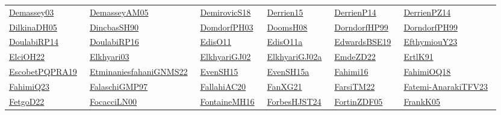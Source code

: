 \begin{longtable}{*{6}{l}}
\href{works/Demassey03.pdf}{Demassey03}~\cite{Demassey03} & \href{}{DemasseyAM05}~\cite{DemasseyAM05} & \href{works/DemirovicS18.pdf}{DemirovicS18}~\cite{DemirovicS18} & \href{works/Derrien15.pdf}{Derrien15}~\cite{Derrien15} & \href{works/DerrienP14.pdf}{DerrienP14}~\cite{DerrienP14} & \href{works/DerrienPZ14.pdf}{DerrienPZ14}~\cite{DerrienPZ14}\\ 
\href{works/DilkinaDH05.pdf}{DilkinaDH05}~\cite{DilkinaDH05} & \href{works/DincbasSH90.pdf}{DincbasSH90}~\cite{DincbasSH90} & \href{}{DomdorfPH03}~\cite{DomdorfPH03} & \href{works/DoomsH08.pdf}{DoomsH08}~\cite{DoomsH08} & \href{}{DorndorfHP99}~\cite{DorndorfHP99} & \href{}{DorndorfPH99}~\cite{DorndorfPH99}\\ 
\href{works/DoulabiRP14.pdf}{DoulabiRP14}~\cite{DoulabiRP14} & \href{works/DoulabiRP16.pdf}{DoulabiRP16}~\cite{DoulabiRP16} & \href{works/EdisO11.pdf}{EdisO11}~\cite{EdisO11} & \href{}{EdisO11a}~\cite{EdisO11a} & \href{}{EdwardsBSE19}~\cite{EdwardsBSE19} & \href{works/EfthymiouY23.pdf}{EfthymiouY23}~\cite{EfthymiouY23}\\ 
\href{}{ElciOH22}~\cite{ElciOH22} & \href{works/Elkhyari03.pdf}{Elkhyari03}~\cite{Elkhyari03} & \href{works/ElkhyariGJ02.pdf}{ElkhyariGJ02}~\cite{ElkhyariGJ02} & \href{works/ElkhyariGJ02a.pdf}{ElkhyariGJ02a}~\cite{ElkhyariGJ02a} & \href{works/EmdeZD22.pdf}{EmdeZD22}~\cite{EmdeZD22} & \href{works/ErtlK91.pdf}{ErtlK91}~\cite{ErtlK91}\\ 
\href{works/EscobetPQPRA19.pdf}{EscobetPQPRA19}~\cite{EscobetPQPRA19} & \href{works/EtminaniesfahaniGNMS22.pdf}{EtminaniesfahaniGNMS22}~\cite{EtminaniesfahaniGNMS22} & \href{works/EvenSH15.pdf}{EvenSH15}~\cite{EvenSH15} & \href{works/EvenSH15a.pdf}{EvenSH15a}~\cite{EvenSH15a} & \href{works/Fahimi16.pdf}{Fahimi16}~\cite{Fahimi16} & \href{works/FahimiOQ18.pdf}{FahimiOQ18}~\cite{FahimiOQ18}\\ 
\href{}{FahimiQ23}~\cite{FahimiQ23} & \href{works/FalaschiGMP97.pdf}{FalaschiGMP97}~\cite{FalaschiGMP97} & \href{works/FallahiAC20.pdf}{FallahiAC20}~\cite{FallahiAC20} & \href{works/FanXG21.pdf}{FanXG21}~\cite{FanXG21} & \href{works/FarsiTM22.pdf}{FarsiTM22}~\cite{FarsiTM22} & \href{}{Fatemi-AnarakiTFV23}~\cite{Fatemi-AnarakiTFV23}\\ 
\href{works/FetgoD22.pdf}{FetgoD22}~\cite{FetgoD22} & \href{works/FocacciLN00.pdf}{FocacciLN00}~\cite{FocacciLN00} & \href{works/FontaineMH16.pdf}{FontaineMH16}~\cite{FontaineMH16} & \href{works/ForbesHJST24.pdf}{ForbesHJST24}~\cite{ForbesHJST24} & \href{works/FortinZDF05.pdf}{FortinZDF05}~\cite{FortinZDF05} & \href{works/FrankK05.pdf}{FrankK05}~\cite{FrankK05}\\ 

\end{longtable}
